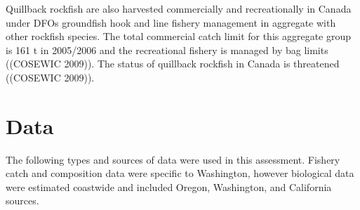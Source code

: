 \documentclass[11pt,
  english,
  a4paper,
]{article}
\begin{document}
\leavevmode\tagmcend\tagstructend\par


Quillback rockfish are also harvested commercially and recreationally in Canada under DFOs groundfish hook and line fishery management in aggregate with other rockfish species. The total commercial catch limit for this aggregate group is 161 t in 2005/2006 and the recreational fishery is managed by bag limits ({(COSEWIC 2009)\leavevmode\tagmcend\tagstructend}). The status of quillback rockfish in Canada is threatened ({(COSEWIC 2009)\leavevmode\tagmcend\tagstructend}).

\leavevmode\tagmcend\tagstructend\par


\hypertarget{data}{%
\section{Data}\label{data}}

\leavevmode\tagmcend\tagstructend


The following types and sources of data were used in this assessment. Fishery catch and composition data were specific to Washington, however biological data were estimated coastwide and included Oregon, Washington, and California sources.

\leavevmode\tagmcend\tagstructend\par

\end{document}
